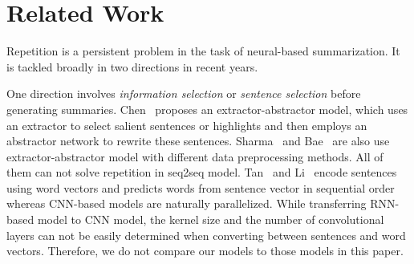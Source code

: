 \section{Related Work}
\label{sec:related}
Repetition is a persistent problem in the task of 
neural-based summarization. 
It is tackled broadly in two directions in recent years. 

One direction involves {\em information selection} or 
{\em sentence selection} before generating summaries.
Chen~ proposes an extractor-abstractor model, which uses an extractor  
to select salient sentences or highlights and then employs 
an abstractor network to rewrite these sentences.
Sharma~\cite{SharmaHHW19} and Bae~ are also use extractor-abstractor model 
with different data preprocessing methods.
All of them can not solve repetition in seq2seq model.
Tan~ and Li~ encode
sentences using word vectors
and predicts words from sentence vector in sequential order 
whereas CNN-based models are naturally parallelized. 
While transferring RNN-based model to CNN model, 
the kernel size and the number of 
convolutional layers can not be easily determined when
converting between sentences and word vectors. 
Therefore, we do not compare our models to those models in this paper. 

